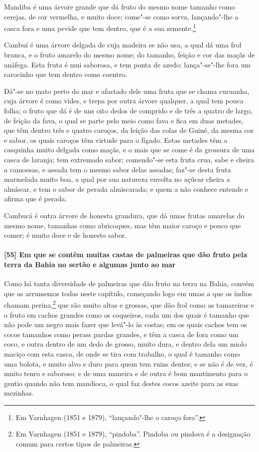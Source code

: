 Mandiba é uma árvore grande que dá fruto do mesmo nome tamanho como cerejas, de cor
vermelha, e muito doce; come"-se como sorva, lançando"-lhe a casca fora e uma pevide que tem
dentro, que é a sua semente.\footnote{ Em Varnhagen (1851 e 1879), ``lançando"-lhe o caroço
fora''.}

Cambuí é uma árvore delgada de cuja madeira se não usa, a qual dá uma frol branca, e o
fruto amarelo do mesmo nome; do tamanho, feição e cor das maçãs de anáfega. Esta fruta é
mui saborosa, e tem ponta de azedo; lança"-se"-lhe fora um carocinho que tem dentro como
coentro.

Dá"-se no mato perto do mar e afastado dele uma fruta que se chama curuanha, cuja árvore é
como vides, e trepa por outra árvore qualquer, a qual tem pouca folha; o fruto que dá é de
uns oito dedos de comprido e de três a quatro de largo, de feição da fava, o qual se parte
pelo meio como fava e fica em duas metades, que têm dentro três e quatro caroços, da
feição das colas de Guiné, da mesma cor e sabor, os quais caroços têm virtude para o
fígado. Estas metades têm a casquinha muito delgada como maçãs, e o mais que se come é da
grossura de uma casca de laranja; tem extremado sabor; comendo"-se esta fruta crua, sabe e
cheira a camoesas, e assada tem o mesmo sabor delas assadas; faz"-se desta fruta marmelada
muito boa, a qual por sua natureza envolta no açúcar cheira a almíscar, e tem o sabor de
perada almiscarada; e quem a não conhece entende e afirma que é perada.

Cambucá é outra árvore de honesta grandura, que dá umas frutas amarelas do mesmo nome,
tamanhas como abricoques, mas têm maior caroço e pouco que comer; é muito doce e de
honesto sabor.

\paragraph{[55] Em que se contêm muitas castas de palmeiras que dão fruto pela terra da
Bahia no sertão e algumas junto ao mar}\quad
Como há tanta diversidade de palmeiras que dão fruto na terra na Bahia, convém que as
arrumemos todas neste capítulo, começando logo em umas a que os índios chamam
perina,\footnote{ Em Varnhagen (1851 e 1879), ``pindoba''. Pindoba ou pindova é a
designação comum para certos tipos de palmeiras.} que são muito altas e grossas, que dão
frol como as tamareiras e o fruto em cachos grandes como os coqueiros, cada um dos quais é
tamanho que não pode um negro mais fazer que levá"-lo às costas; em os quais cachos tem os
cocos tamanhos como perass pardas grandes, e têm a casca de fora como um coco, e outra
dentro de um dedo de grosso, muito dura, e dentro dela um miolo maciço com esta casca, de
onde se tira com trabalho, o qual é tamanho como uma bolota, e muito alvo e duro para quem
tem ruins dentes; e se não é de vez, é muito tenro e saboroso; e de uma maneira e de outra
é bom mantimento para o gentio quando não tem mandioca, o qual faz destes cocos azeite
para as suas mezinhas.

